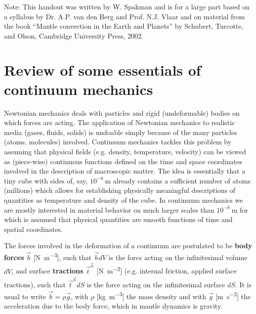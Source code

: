 Note: 
This handout was written by W. Spakman and 
is for a large part based on a syllabus by Dr. A.P. van den Berg and Prof. N.J. Vlaar
and on material from the book “Mantle convection in the Earth and Planets” by Schubert, Turcotte,
and Olson, Cambridge University Press, 2002.

\section{Review of some essentials of continuum mechanics}


Newtonian mechanics deals with particles and rigid (undeformable) bodies on which
forces are acting. The application of Newtonian mechanics to realistic media (gases,
fluids, solids) is undoable simply because of the many particles (atoms, molecules)
involved. Continuum mechanics tackles this problem by assuming that physical fields
(e.g. density, temperature, velocity) can be viewed as (piece-wise) continuous functions
defined on the time and space coordinates involved in the description of macroscopic
matter. The idea is essentially that a tiny cube with sides of, 
say, $10^{-8}~\si{\meter}$ already contains
a sufficient number of atoms (millions) which allows for establishing physically
meaningful descriptions of quantities as temperature and density of the cube. In
continuum mechanics we are mostly interested in material behavior on much larger scales
than $10^{-8}~\si{\meter}$ for which is assumed that physical quantities 
are smooth functions of time and spatial coordinates.

The forces involved in the deformation of a continuum are postulated to be 
{\bf body forces}
$\vec{b}$ [\si{\newton\per\cubic\meter}], 
such that $\vec{b}dV$ is the force acting on the infinitesimal 
volume $dV$, and surface 
{\bf tractions} $\vec{t}^{\vec n}$ [\si{\newton\per\square\meter}]
(e.g. internal friction, applied surface tractions), 
such that $\vec{t}^{\vec n} dS$ is the
force acting on the infinitesimal surface $dS$. 
It is usual to write $\vec{b} = \rho \vec{g}$, 
with $\rho$ [\si{\kg\per\cubic\meter}] the
mass density and with $\vec{g}$ [\si{\meter\per\square\second}]
the acceleration due to the body force, which in
mantle dynamics is gravity. 

